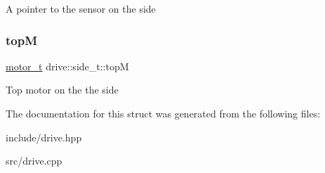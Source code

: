 A pointer to the sensor on the side \mbox{\label{structdrive_1_1side__t_a3a32e841a8f53200b37c040572765165}} 
\subsubsection{\texorpdfstring{topM}{topM}}
{\footnotesize\ttfamily \hyperlink{structmotor__t}{motor\+\_\+t} drive\+::side\+\_\+t\+::topM}

Top motor on the the side 

The documentation for this struct was generated from the following files\+:\begin{DoxyCompactItemize}
\item 
include/drive.\+hpp\item 
src/drive.\+cpp\end{DoxyCompactItemize}
